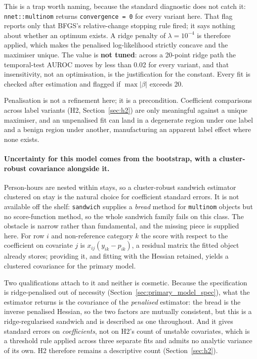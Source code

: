 This is a trap worth naming, because the standard diagnostic does not catch it:
\texttt{nnet::multinom} returns \texttt{convergence = 0} for every variant here.
That flag reports only that BFGS's relative-change stopping rule fired; it says
nothing about whether an optimum exists. A ridge penalty of
$\lambda = 10^{-4}$ is therefore applied, which makes the penalised
log-likelihood strictly concave and the maximiser unique. The value is
\textbf{not tuned}: across a 20-point ridge path the temporal-test AUROC moves
by less than 0.02 for every variant, and that insensitivity, not an
optimisation, is the justification for the constant. Every fit is checked
after estimation and flagged if $\max|\beta|$ exceeds 20.

Penalisation is not a refinement here; it is a precondition. Coefficient
comparisons across label variants (H2, Section~\ref{sec:h2}) are only meaningful
against a unique maximiser, and an unpenalised fit can land in a degenerate
region under one label and a benign region under another, manufacturing an
apparent label effect where none exists.

\paragraph{Uncertainty for this model comes from the bootstrap, with a
cluster-robust covariance alongside it.}
Person-hours are nested within stays, so a cluster-robust sandwich estimator
clustered on stay is the natural choice for coefficient standard errors. It is
not available off the shelf: \texttt{sandwich} supplies a \emph{bread} method
for \texttt{multinom} objects but no score-function method, so the whole
sandwich family fails on this class. The obstacle is narrow rather than
fundamental, and the missing piece is supplied here. For row $i$ and
non-reference category $k$ the score with respect to the coefficient on
covariate $j$ is $x_{ij}(y_{ik} - p_{ik})$, a residual matrix the fitted object
already stores; providing it, and fitting with the Hessian retained, yields a
clustered covariance for the primary model.

Two qualifications attach to it and neither is cosmetic. Because the
specification is ridge-penalised out of necessity
(Section~\ref{sec:primary_model_spec}), what the estimator returns is the
covariance of the \emph{penalised} estimator: the bread is the inverse penalised
Hessian, so the two factors are mutually consistent, but this is a
ridge-regularised sandwich and is described as one throughout. And it gives
standard errors on \emph{coefficients}, not on H2's count of unstable
covariates, which is a threshold rule applied across three separate fits and
admits no analytic variance of its own. H2 therefore remains a descriptive
count (Section~\ref{sec:h2}).

